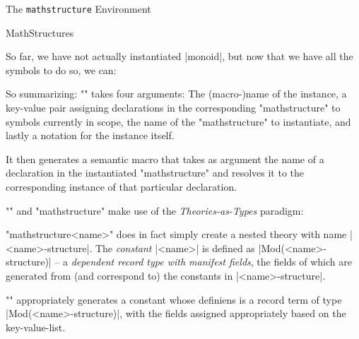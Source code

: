 \begin{sfragment}{The \texttt{mathstructure} Environment}
\begin{smodule}[ns=https://github.com/slatex/sTeX/doc]{MathStructures}

        So far, we have not actually instantiated |monoid|, but now
        that we have all the symbols to do so, we can:

        \begin{function}{\instantiate}
            So summarizing:
            \stexcode"\instantiate" takes four arguments: The 
            (macro-)name of the instance, a key-value pair assigning
            declarations in the corresponding \stexcode"mathstructure"
            to symbols currently in scope, the name of the \stexcode"mathstructure"
            to instantiate, and lastly a notation for the instance itself.

            It then generates a semantic macro that takes as argument
            the name of a declaration in the instantiated \stexcode"mathstructure"
            and resolves it to the corresponding instance of that particular declaration.
        \end{function}

        \begin{mmtbox}
            \stexcode"\instantiate" and \stexcode"mathstructure"
            make use of the \emph{Theories-as-Types} paradigm:

            \stexcode"mathstructure{<name>}" does in fact simply create
            a nested theory with name |<name>-structure|. The \emph{constant}
            |<name>| is defined as |Mod(<name>-structure)| -- 
            a \emph{dependent record type with manifest fields}, the fields
            of which are generated from (and correspond to) the constants
            in |<name>-structure|.

            \stexcode"\instantiate" appropriately generates a constant
            whose definiens is a record term of type |Mod(<name>-structure)|,
            with the fields assigned appropriately based on the key-value-list.
        \end{mmtbox}


\end{smodule}
\end{sfragment}
